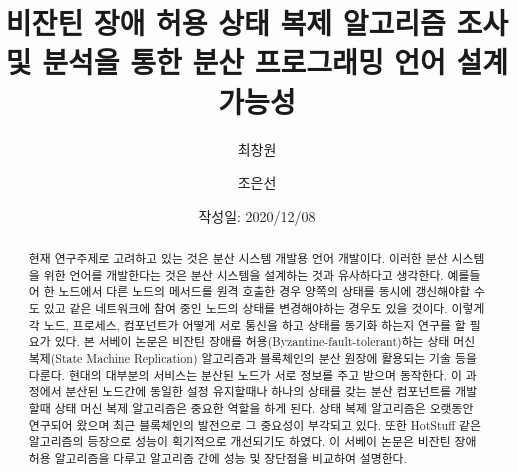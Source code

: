 \documentclass[table,smallextended]{svjour3}       %
\begin{document}
\title{비잔틴 장애 허용 상태 복제 알고리즘 조사 및 분석을 통한 분산 프로그래밍 언어 설계 가능성}


\author{최창원         \and
        조은선 %
}



\date{작성일: 2020/12/08}


\maketitle

\renewcommand{\abstractname}{초록}
\renewcommand{\refname}{참조}
\begin{abstract}
현재 연구주제로 고려하고 있는 것은 분산 시스템 개발용 언어 개발이다. 이러한 분산 시스템을 위한 언어를 개발한다는 것은
분산 시스템을 설계하는 것과 유사하다고 생각한다. 예를들어 한 노드에서 다른 노드의 메서드를 원격 호출한 경우 
양쪽의 상태를 동시에 갱신해야할 수도 있고 같은 네트워크에 참여 중인 노드의 상태를 변경해야하는 경우도 있을 것이다.
이렇게 각 노드, 프로세스, 컴포넌트가 어떻게 서로 통신을 하고 상태를 동기화 하는지 연구를 할 필요가 있다.
본 서베이 논문은 비잔틴 장애를 허용(Byzantine-fault-tolerant)하는 
상태 머신 복제(State Machine Replication) 알고리즘과 블록체인의 분산 원장에 활용되는 기술 등을 다룬다. 
현대의 대부분의 서비스는 분산된 노드가 서로 정보를 주고 받으며 동작한다.
이 과정에서 분산된 노드간에 동일한 설정 유지할때나 하나의 상태를 갖는 분산 컴포넌트를 개발할때
상태 머신 복제 알고리즘은 중요한 역할을 하게 된다. 상태 복제 알고리즘은 오랫동안 연구되어 왔으며 최근 블록체인의
발전으로 그 중요성이 부각되고 있다. 또한 HotStuff 같은 알고리즘의 등장으로 성능이 획기적으로
개선되기도 하였다. 이 서베이 논문은 비잔틴 장애 허용 알고리즘을 다루고
알고리즘 간에 성능 및 장단점을 비교하여 설명한다.

\end{abstract}
\end{document}
